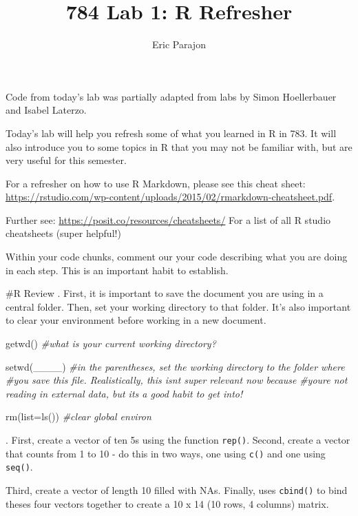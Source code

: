 \documentclass[
]{article}
\title{784 Lab 1: R Refresher}
\author{Eric Parajon}
\date{}
\newenvironment{Shaded}{\begin{snugshade}}{\end{snugshade}}
\newcommand{\AttributeTok}[1]{\textcolor[rgb]{0.77,0.63,0.00}{#1}}
\newcommand{\CommentTok}[1]{\textcolor[rgb]{0.56,0.35,0.01}{\textit{#1}}}
\newcommand{\FunctionTok}[1]{\textcolor[rgb]{0.00,0.00,0.00}{#1}}
\newcommand{\NormalTok}[1]{#1}
\begin{document}
\maketitle

Code from today's lab was partially adapted from labs by Simon
Hoellerbauer and Isabel Laterzo.

Today's lab will help you refresh some of what you learned in R in 783.
It will also introduce you to some topics in R that you may not be
familiar with, but are very useful for this semester.

For a refresher on how to use R Markdown, please see this cheat sheet:
\url{https://rstudio.com/wp-content/uploads/2015/02/rmarkdown-cheatsheet.pdf}.

Further see: \url{https://posit.co/resources/cheatsheets/} For a list of
all R studio cheatsheets (super helpful!)

Within your code chunks, comment our your code describing what you are
doing in each step. This is an important habit to establish.

\#R Review . First, it is important to save the document you are using in a
central folder. Then, set your working directory to that folder. It's
also important to clear your environment before working in a new
document.

\begin{Shaded}
\begin{Highlighting}[]
\FunctionTok{getwd}\NormalTok{() }\CommentTok{\#what is your current working directory?}

\FunctionTok{setwd}\NormalTok{(\_\_\_\_) }\CommentTok{\#in the parentheses, set the working directory to the folder where}
\CommentTok{\#you save this file. Realistically, this isn\textquotesingle{}t super relevant now because}
\CommentTok{\#you\textquotesingle{}re not reading in external data, but it\textquotesingle{}s a good habit to get into!}

\FunctionTok{rm}\NormalTok{(}\AttributeTok{list=}\FunctionTok{ls}\NormalTok{()) }\CommentTok{\#clear global environ}
\end{Highlighting}
\end{Shaded}

. First, create a vector of ten 5s using the function \texttt{rep()}.
Second, create a vector that counts from 1 to 10 - do this in two ways,
one using \texttt{c()} and one using \texttt{seq()}.

Third, create a vector of length 10 filled with NAs. Finally, uses
\texttt{cbind()} to bind theses four vectors together to create a 10 x
14 (10 rows, 4 columns) matrix.
\end{document}
